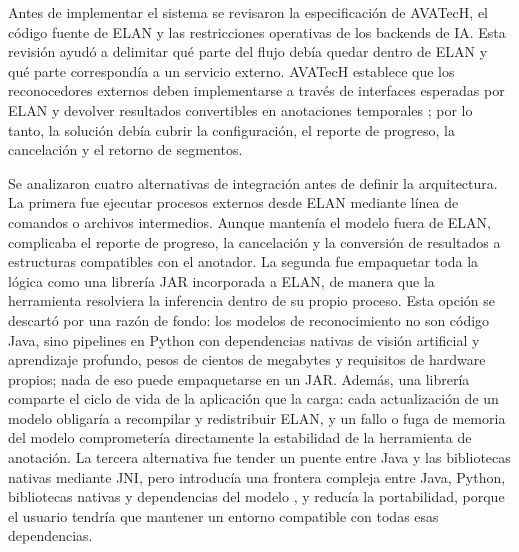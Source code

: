 \documentclass[11pt,a4paper]{article}
\begin{document}
Antes de implementar el sistema se revisaron la especificación de AVATecH, el código fuente de ELAN y las restricciones operativas de los backends de IA. Esta revisión ayudó a delimitar qué parte del flujo debía quedar dentro de ELAN y qué parte correspondía a un servicio externo. AVATecH establece que los reconocedores externos deben implementarse a través de interfaces esperadas por ELAN y devolver resultados convertibles en anotaciones temporales \cite{auer2014avatech}; por lo tanto, la solución debía cubrir la configuración, el reporte de progreso, la cancelación y el retorno de segmentos.

Se analizaron cuatro alternativas de integración antes de definir la arquitectura. La primera fue ejecutar procesos externos desde ELAN mediante línea de comandos o archivos intermedios. Aunque mantenía el modelo fuera de ELAN, complicaba el reporte de progreso, la cancelación y la conversión de resultados a estructuras compatibles con el anotador. La segunda fue empaquetar toda la lógica como una librería JAR incorporada a ELAN, de manera que la herramienta resolviera la inferencia dentro de su propio proceso. Esta opción se descartó por una razón de fondo: los modelos de reconocimiento no son código Java, sino pipelines en Python con dependencias nativas de visión artificial y aprendizaje profundo, pesos de cientos de megabytes y requisitos de hardware propios; nada de eso puede empaquetarse en un JAR. Además, una librería comparte el ciclo de vida de la aplicación que la carga: cada actualización de un modelo obligaría a recompilar y redistribuir ELAN, y un fallo o fuga de memoria del modelo comprometería directamente la estabilidad de la herramienta de anotación. La tercera alternativa fue tender un puente entre Java y las bibliotecas nativas mediante JNI, pero introducía una frontera compleja entre Java, Python, bibliotecas nativas y dependencias del modelo \cite{oracle_jni}, y reducía la portabilidad, porque el usuario tendría que mantener un entorno compatible con todas esas dependencias.
\end{document}
